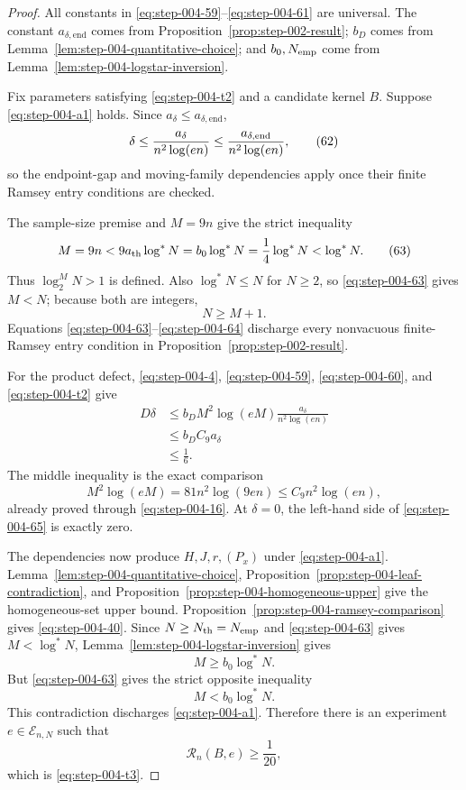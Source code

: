 \begin{proof}

All constants in \eqref{eq:step-004-59}--\eqref{eq:step-004-61} are universal.  The constant \(a_{\delta,\mathrm{end}}\) comes from Proposition~\ref{prop:step-002-result}; \(b_D\) comes from Lemma~\ref{lem:step-004-quantitative-choice}; and \(b_0,N_{\rm emp}\) come from Lemma~\ref{lem:step-004-logstar-inversion}.

Fix parameters satisfying \eqref{eq:step-004-t2} and a candidate kernel \(B\). Suppose \eqref{eq:step-004-a1} holds. Since \(a_\delta\le a_{\delta,\mathrm{end}}\),
\[
\delta
\le\frac{a_\delta}{n^2\log(en)}
\le\frac{a_{\delta,{\rm end}}}{n^2\log(en)},
\tag{62}\label{eq:step-004-62}
\]
so the endpoint-gap and moving-family dependencies apply once their finite Ramsey entry conditions are checked.

The sample-size premise and \(M=9n\) give the strict inequality
\[
M=9n
<9a_{\rm th}\log^*N
=b_0\log^*N
=\frac14\log^*N
<\log^*N.
\tag{63}\label{eq:step-004-63}
\]
Thus \(\log_2^{M}N>1\) is defined. Also \(\log^*N\le N\) for \(N\ge 2\), so \eqref{eq:step-004-63} gives \(M<N\); because both are integers,
\[
N\ge M+1.
\tag{64}\label{eq:step-004-64}
\]
Equations \eqref{eq:step-004-63}--\eqref{eq:step-004-64} discharge every nonvacuous finite-Ramsey entry condition in Proposition~\ref{prop:step-002-result}.

For the product defect, \eqref{eq:step-004-4}, \eqref{eq:step-004-59}, \eqref{eq:step-004-60}, and \eqref{eq:step-004-t2} give
\[
\begin{aligned}
D\delta
&\le b_DM^2\log(eM)
\frac{a_\delta}{n^2\log(en)}\\
&\le b_DC_9a_\delta\\
&\le\frac16.
\end{aligned}
\tag{65}\label{eq:step-004-65}
\]
The middle inequality is the exact comparison
\[
M^2\log(eM)
=81n^2\log(9en)
\le C_9n^2\log(en),
\tag{66}\label{eq:step-004-66}
\]
already proved through \eqref{eq:step-004-16}. At \(\delta=0\), the left-hand side of \eqref{eq:step-004-65} is exactly zero.

The dependencies now produce \(H,J,r,(P_x)\) under \eqref{eq:step-004-a1}. Lemma~\ref{lem:step-004-quantitative-choice}, Proposition~\ref{prop:step-004-leaf-contradiction}, and Proposition~\ref{prop:step-004-homogeneous-upper} give the homogeneous-set upper bound. Proposition~\ref{prop:step-004-ramsey-comparison} gives \eqref{eq:step-004-40}. Since \(N\ge N_{\rm th}=N_{\rm emp}\) and \eqref{eq:step-004-63} gives \(M<\log^*N\), Lemma~\ref{lem:step-004-logstar-inversion} gives
\[
M\ge b_0\log^*N.
\tag{67}\label{eq:step-004-67}
\]
But \eqref{eq:step-004-63} gives the strict opposite inequality
\[
M<b_0\log^*N.
\tag{68}\label{eq:step-004-68}
\]
This contradiction discharges \eqref{eq:step-004-a1}. Therefore there is an experiment \(e \in \mathcal E_{n,N}\) such that
\[
\mathcal R_n(B,e)\ge\frac1{20},
\]
which is \eqref{eq:step-004-t3}.


\end{proof}
